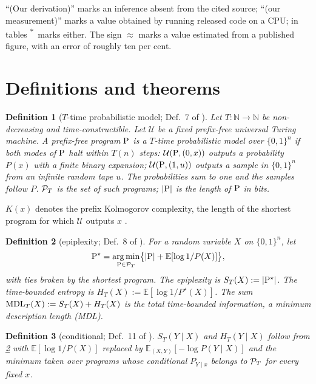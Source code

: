\documentclass[11pt]{article}
\newcommand{\E}{\mathbb{E}}\newcommand{\N}{\mathbb{N}}\newcommand{\R}{\mathbb{R}}
\newcommand{\od}{\textsuperscript{$\ast$}}
\DeclareMathOperator*{\argmin}{arg\,min}
\theoremstyle{tight}
\newtheorem{definition}{Definition}\newtheorem{proposition}{Proposition}
\begin{document}
``(Our derivation)'' marks an inference absent from the cited source; ``(our measurement)'' marks a
value obtained by running released code on a CPU; in tables \od\ marks either. The sign $\approx$
marks a value estimated from a published figure, with an error of roughly ten per cent.

\section{Definitions and theorems}\label{sec:defs}
\begin{definition}[$T$-time probabilistic model; Def.~7 of \citealp{finzi2026epiplexity}]\label{def:model}
Let $T:\N\to\N$ be non-decreasing and time-constructible. Let $\mathcal U$ be a fixed prefix-free
universal Turing machine. A prefix-free program $\mathrm{P}$ is a $T$-time probabilistic model over
$\{0,1\}^n$ if both modes of $\mathrm{P}$ halt within $T(n)$ steps: $\mathcal U(\mathrm{P},(0,x))$ outputs a
probability $P(x)$ with a finite binary expansion; $\mathcal U(\mathrm{P},(1,u))$ outputs a sample in
$\{0,1\}^n$ from an infinite random tape $u$. The probabilities sum to one and the samples follow
$P$. $\mathcal{P}_T$ is the set of such programs; $|\mathrm{P}|$ is the length of $\mathrm{P}$ in bits.
\end{definition}

$K(x)$ denotes the prefix Kolmogorov complexity, the length of the shortest program for which
$\mathcal U$ outputs $x$ \citep{livitanyi2019}.

\begin{definition}[epiplexity; Def.~8 of \citealp{finzi2026epiplexity}]\label{def:epi}
For a random variable $X$ on $\{0,1\}^n$, let
\[
\prog^\star=\argmin_{\prog\in\PT}\bigl\{|\prog|+\E[\log 1/P(X)]\bigr\},
\]
with ties broken by the shortest program. The epiplexity is $S_T(X):=|\mathrm{P}^\star|$. The
time-bounded entropy is $H_T(X):=\E[\log 1/P^\star(X)]$. The sum $\mathrm{MDL}_T(X):=S_T(X)+H_T(X)$ is the
total time-bounded information, a minimum description length (MDL).
\end{definition}

\begin{definition}[conditional; Def.~11 of \citealp{finzi2026epiplexity}]\label{def:cond}
$S_T(Y\mid X)$ and $H_T(Y\mid X)$ follow from \cref{def:epi} with $\E[\log1/P(X)]$ replaced by
$\E_{(X,Y)}[-\log P(Y\mid X)]$ and the minimum taken over programs whose conditional $P_{Y\mid x}$
belongs to $\mathcal{P}_T$ for every fixed $x$.
\end{definition}
\end{document}
